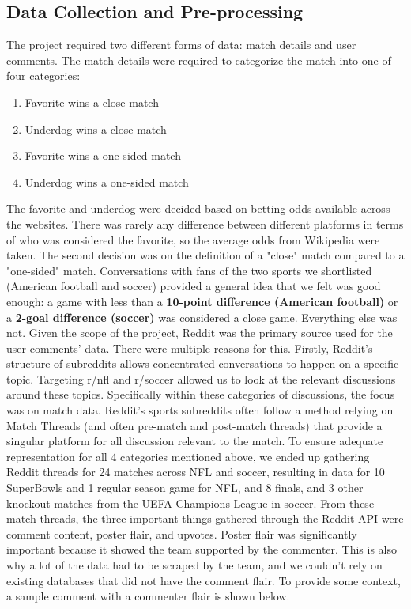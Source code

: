 \documentclass{article}
\begin{document}
\subsection{Data Collection and Pre-processing}
The project required two different forms of data: match details and user comments. The match details were required to categorize the match into one of four categories: 
\begin{enumerate}
    \item Favorite wins a close match
    \item Underdog wins a close match
    \item Favorite wins a one-sided match
    \item Underdog wins a one-sided match
    
\end{enumerate}
The favorite and underdog were decided based on betting odds available across the websites. There was rarely any difference between different platforms in terms of who was considered the favorite, so the average odds from Wikipedia were taken. 
The second decision was on the definition of a "close" match compared to a "one-sided" match. Conversations with fans of the two sports we shortlisted (American football and soccer) provided a general idea that we felt was good enough: a game with less than a \textbf{10-point difference (American football)} or a \textbf{2-goal difference (soccer)} was considered a close game. Everything else was not.
Given the scope of the project, Reddit was the primary source used for the user comments' data. There were multiple reasons for this. Firstly, Reddit's structure of subreddits allows concentrated conversations to happen on a specific topic. Targeting r/nfl and r/soccer allowed us to look at the relevant discussions around these topics. Specifically within these categories of discussions, the focus was on match data. Reddit's sports subreddits often follow a method relying on Match Threads (and often pre-match and post-match threads) that provide a singular platform for all discussion relevant to the match. To ensure adequate representation for all 4 categories mentioned above, we ended up gathering Reddit threads for 24 matches across NFL and soccer, resulting in data for 10 SuperBowls and 1 regular season game for NFL, and 8 finals, and 3 other knockout matches from the UEFA Champions League in soccer.
From these match threads, the three important things gathered through the Reddit API were comment content, poster flair, and upvotes. Poster flair was significantly important because it showed the team supported by the commenter. This is also why a lot of the data had to be scraped by the team, and we couldn't rely on existing databases that did not have the comment flair. To provide some context, a sample comment with a commenter flair is shown below.
\end{document}
